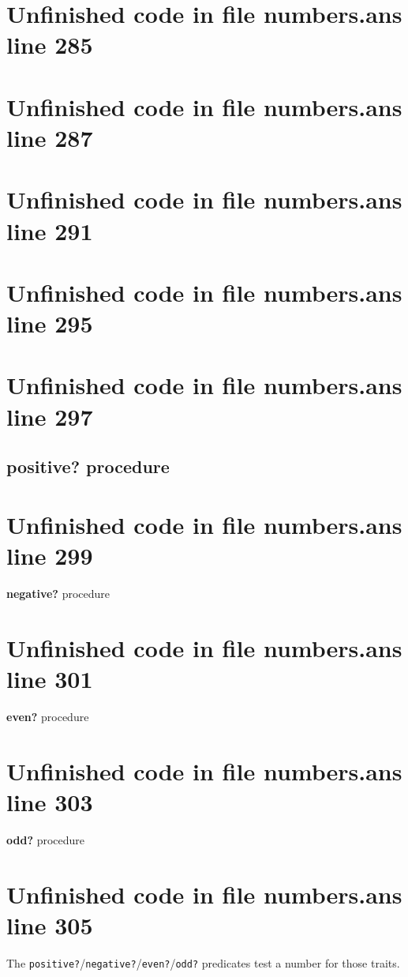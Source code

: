 \documentclass[twoside,9pt]{report}
\begin{document}
\section{Unfinished code in file numbers.ans line 285}
\section{Unfinished code in file numbers.ans line 287}
\section{Unfinished code in file numbers.ans line 291}
\section{Unfinished code in file numbers.ans line 295}
\section{Unfinished code in file numbers.ans line 297}
\subsection{positive? procedure}
\label{positive?-procedure}
\section{Unfinished code in file numbers.ans line 299}

\noindent \textbf{negative?} procedure

\section{Unfinished code in file numbers.ans line 301}

\noindent \textbf{even?} procedure

\section{Unfinished code in file numbers.ans line 303}

\noindent \textbf{odd?} procedure

\section{Unfinished code in file numbers.ans line 305}


The \texttt{positive?}/\texttt{negative?}/\texttt{even?}/\texttt{odd?} predicates test a number for those traits.
\end{document}
